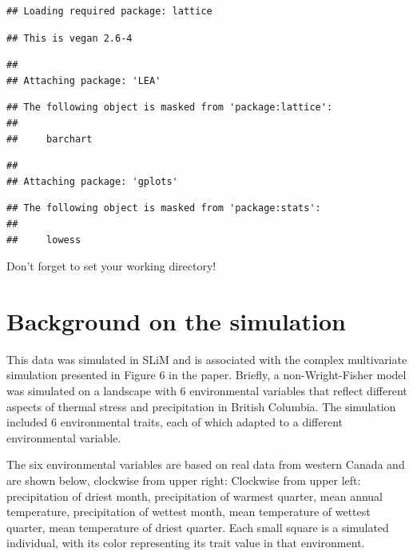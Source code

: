 \documentclass[
]{article}
\begin{document}
\begin{verbatim}
## Loading required package: lattice
\end{verbatim}

\begin{verbatim}
## This is vegan 2.6-4
\end{verbatim}

\begin{verbatim}
## 
## Attaching package: 'LEA'
\end{verbatim}

\begin{verbatim}
## The following object is masked from 'package:lattice':
## 
##     barchart
\end{verbatim}

\begin{verbatim}
## 
## Attaching package: 'gplots'
\end{verbatim}

\begin{verbatim}
## The following object is masked from 'package:stats':
## 
##     lowess
\end{verbatim}

Don't forget to set your working directory!

\hypertarget{background-on-the-simulation}{%
\section{Background on the
simulation}\label{background-on-the-simulation}}

This data was simulated in SLiM and is associated with the complex
multivariate simulation presented in Figure 6 in the paper. Briefly, a
non-Wright-Fisher model was simulated on a landscape with 6
environmental variables that reflect different aspects of thermal stress
and precipitation in British Columbia. The simulation included 6
environmental traits, each of which adapted to a different environmental
variable.

The six environmental variables are based on real data from western
Canada and are shown below, clockwise from upper right: Clockwise from
upper left: precipitation of driest month, precipitation of warmest
quarter, mean annual temperature, precipitation of wettest month, mean
temperature of wettest quarter, mean temperature of driest quarter. Each
small square is a simulated individual, with its color representing its
trait value in that environment.
\end{document}
